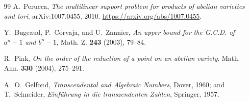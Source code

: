 \documentclass[11pt]{article}
\theoremstyle{definition}
\theoremstyle{remark}
\begin{document}
\begin{thebibliography}{99}
A.~Perucca,
\emph{The multilinear support problem for products of abelian varieties and tori},
arXiv:1007.0455, 2010.
\url{https://arxiv.org/abs/1007.0455}.

Y.~Bugeaud, P.~Corvaja, and U.~Zannier,
\emph{An upper bound for the G.C.D. of $a^n-1$ and $b^n-1$},
Math. Z. \textbf{243} (2003), 79--84.

R.~Pink,
\emph{On the order of the reduction of a point on an abelian variety},
Math. Ann. \textbf{330} (2004), 275--291.

A.~O.~Gelfond,
\emph{Transcendental and Algebraic Numbers},
Dover, 1960;
and T.~Schneider, \emph{Einf\"uhrung in die transzendenten Zahlen}, Springer, 1957.

\end{thebibliography}
\end{document}
